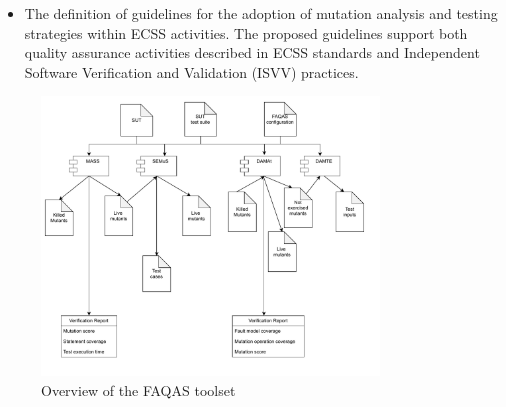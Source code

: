 \begin{itemize}
\item The definition of guidelines for the adoption of mutation analysis and testing strategies within ECSS activities. The proposed guidelines support both quality assurance activities described in ECSS standards and Independent Software Verification and Validation (ISVV) practices.
\end{itemize}

\begin{figure}[tb]
\begin{center}
\includegraphics[width=0.8\textwidth]{images/FAQAS.drawio.pdf}
\caption{Overview of the FAQAS toolset}
\label{fig:FAQAS:toolset}
\end{center}
\end{figure}

